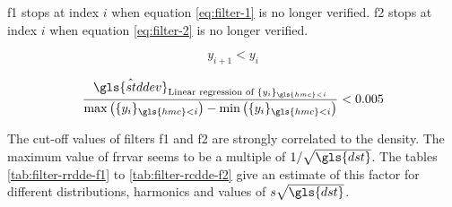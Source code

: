%
%

\bigskip

\gls{f1} stops at index \( i \) when equation \eqref{eq:filter-1} is no longer verified.
\gls{f2} stops at index \( i \) when equation \eqref{eq:filter-2} is no longer verified.

\begin{equation}\label{eq:filter-1}
y_{i+1} < y_i
\end{equation}

\begin{equation}\label{eq:filter-2}
\frac{\hat{\gls{stddev}}_{\text{Linear regression of } \{ y_i \}_{\gls{hmc}<i}}}{\max \left( \{ y_i \}_{\gls{hmc}<i} \right) - \min \left( \{ y_i \}_{\gls{hmc}<i} \right)} < 0.005
\end{equation}

\bigskip

The cut-off values of filters \gls{f1} and \gls{f2} are strongly correlated to the density.
The maximum value of \gls{frrvar} seems to be a multiple of \( 1 / \sqrt{\gls{dst}} \).
The tables \ref{tab:filter-rrdde-f1} to \ref{tab:filter-rcdde-f2} give an estimate of this factor for different distributions, harmonics and values of \( s \sqrt{\gls{dst}} \).

\bigskip

%
\label{tab:filter-rrdde-f1}

\bigskip

%
\label{tab:filter-rrdde-f2}

\bigskip

%
\label{tab:filter-rcdde-f1}

\bigskip

%
\label{tab:filter-rcdde-f2}

